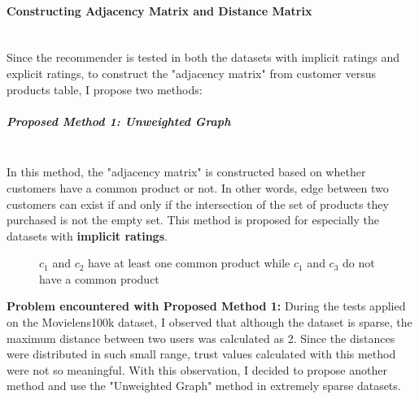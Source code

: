 	\paragraph{Constructing Adjacency Matrix and Distance Matrix}\mbox{}\\
	Since the recommender is tested in both the datasets with implicit ratings and explicit ratings, to construct the "adjacency matrix" from customer versus products table, I propose two methods: 
	\subparagraph{Proposed Method 1: Unweighted Graph}\mbox{}\\
	\label{prop_method_1}
	In this method, the "adjacency matrix" is constructed based on whether customers have a common product or not. In other words, edge between two customers can exist if and only if the intersection of the set of products they purchased is not the empty set. This method is proposed for especially the datasets with \textbf{implicit ratings}.
	\begin{figure}[H]
		\centering
		\caption{$c_{1}$ and $c_{2}$ have at least one common product while $c_{1}$ and $c_{3}$ do not have a common product}
	\end{figure}

	\textbf{Problem encountered with Proposed Method 1:} During the tests applied on the Movielens100k dataset, I observed that although the dataset is sparse, the maximum distance between two users was calculated as 2. Since the distances were distributed in such small range, trust values calculated with this method were not so meaningful. With this observation, I decided to propose another method and use the "Unweighted Graph" method in extremely sparse datasets.
	
